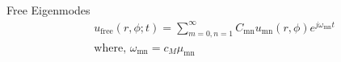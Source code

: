 \documentclass{beamer}
\begin{document}
\begin{frame}[t]
{\begin{exampleblock}{Free Eigenmodes}
                \begin{align}
  &u_{\mathrm{free}}(r,\phi;t)=\displaystyle\sum^\infty_{m=0,n=1}C_\mathrm{mn}u_{\mathrm{mn}}(r,\phi)e^{j\omega_{\mathrm{mn}} t}\\
  &\mbox{where, }\omega_{\mathrm{mn}}=c_M\mu_{\mathrm{mn}}\nonumber
  \end{align}
             \end{exampleblock}}
\end{frame}
\end{document}
